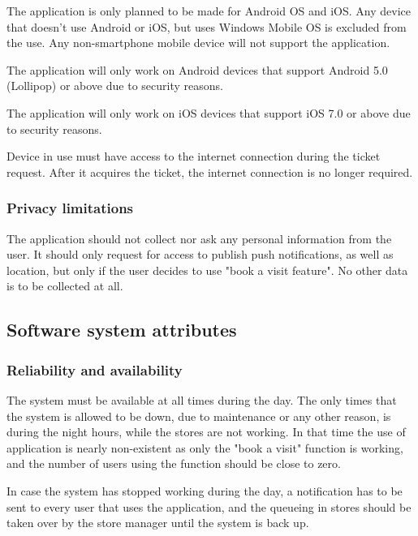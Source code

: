 \hspace{\parindent}The application is only planned to be made for Android OS and iOS. Any device that doesn't use Android or iOS, but uses Windows Mobile OS is excluded from the use. Any non-smartphone mobile device will not support the application.

The application will only work on Android devices that support Android 5.0 (Lollipop) or above due to security reasons. 

The application will only work on iOS devices that support iOS 7.0 or above due to security reasons.

Device in use must have access to the internet connection during the ticket request. After it acquires the ticket, the internet connection is no longer required.
\subsubsection{Privacy limitations}

\hspace{\parindent} The application should not collect nor ask any personal information from the user. It should only request for access to publish push notifications, as well as location, but only if the user decides to use "book a visit feature". No other data is to be collected at all. 

\newpage

\subsection{Software system attributes}
\subsubsection{Reliability and availability}
\hspace{\parindent}The system must be available at all times during the day. The only times that the system is allowed to be down, due to maintenance or any other reason, is during the night hours, while the stores are not working. In that time the use of application is nearly non-existent as only the "book a visit" function is working, and the number of users using the function should be close to zero.

In case the system has stopped working during the day, a notification has to be sent to every user that uses the application, and the queueing in stores should be taken over by the store manager until the system is back up.

